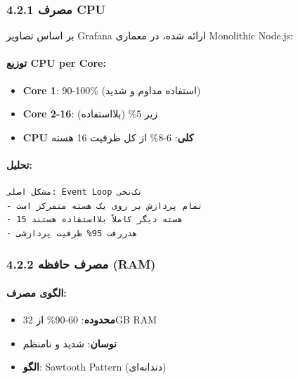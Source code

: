 \documentclass[
]{article}
\providecommand{\tightlist}{%
  \setlength{\itemsep}{0pt}\setlength{\parskip}{0pt}}
\begin{document}
\subsubsection{4.2.1 مصرف CPU}\label{ux645ux635ux631ux641-cpu}

بر اساس تصاویر Grafana ارائه شده، در معماری Monolithic Node.js:

\paragraph{توزیع CPU per
Core:}\label{ux62aux648ux632ux6ccux639-cpu-per-core}

\begin{itemize}
\tightlist
\item
  \textbf{Core 1}: 90-100\% (استفاده مداوم و شدید)
\item
  \textbf{Core 2-16}: زیر 5\% (بلااستفاده)
\item
  \textbf{CPU کلی}: 6-8\% از کل ظرفیت 16 هسته
\end{itemize}

\paragraph{تحلیل:}\label{ux62aux62dux644ux6ccux644}

\begin{verbatim}
مشکل اصلی: Event Loop تک‌نخی
- تمام پردازش بر روی یک هسته متمرکز است
- 15 هسته دیگر کاملاً بلااستفاده هستند
- هدررفت 95% ظرفیت پردازشی
\end{verbatim}

\subsubsection{4.2.2 مصرف حافظه
(RAM)}\label{ux645ux635ux631ux641-ux62dux627ux641ux638ux647-ram}

\paragraph{الگوی
مصرف:}\label{ux627ux644ux6afux648ux6cc-ux645ux635ux631ux641}

\begin{itemize}
\tightlist
\item
  \textbf{محدوده}: 60-90\% از 32GB RAM
\item
  \textbf{نوسان}: شدید و نامنظم
\item
  \textbf{الگو}: Sawtooth Pattern (دندانه‌ای)
\end{itemize}
\end{document}

